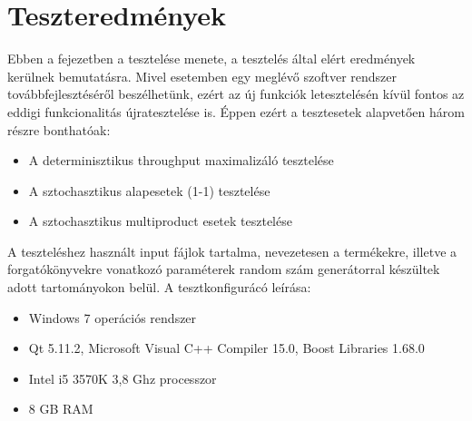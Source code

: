 \chapter{Teszteredmények} \label{Testing}
Ebben a fejezetben a tesztelése menete, a tesztelés által elért eredmények kerülnek bemutatásra.
Mivel esetemben egy meglévő szoftver rendszer továbbfejlesztéséről beszélhetünk, ezért az új funkciók letesztelésén kívül fontos az eddigi funkcionalitás újratesztelése is.
Éppen ezért a tesztesetek alapvetően három részre bonthatóak:
\begin{itemize}
\item A determinisztikus throughput maximalizáló tesztelése
\item A sztochasztikus alapesetek (1-1) tesztelése
\item A sztochasztikus multiproduct esetek tesztelése
\end{itemize}
A teszteléshez használt input fájlok tartalma, nevezetesen a termékekre, illetve a forgatókönyvekre vonatkozó paraméterek random szám generátorral készültek adott tartományokon belül.
A tesztkonfigurácó leírása:
\begin{itemize}
\item Windows 7 operációs rendszer 
\item Qt 5.11.2, Microsoft Visual C++ Compiler 15.0, Boost Libraries 1.68.0
\item Intel i5 3570K 3,8 Ghz processzor
\item 8 GB RAM
\end{itemize}
